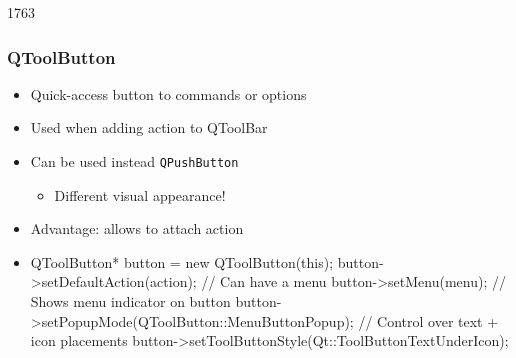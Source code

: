 \begin{slide}[fragile]{1763}\frametitle{QToolButton}
  \begin{itemize}
  \item Quick-access button to commands or options
  \item Used when adding action to QToolBar
  \item Can be used instead \texttt{QPushButton}
    \begin{itemize}
    \item Different visual appearance!
    \end{itemize}
 \item Advantage: allows to attach action
  \item[] \begin{cpp}
QToolButton* button = new QToolButton(this);
button->setDefaultAction(action);
// Can have a menu
button->setMenu(menu);      
// Shows menu indicator on  button
button->setPopupMode(QToolButton::MenuButtonPopup);
// Control over text + icon placements
button->setToolButtonStyle(Qt::ToolButtonTextUnderIcon);
    \end{cpp}

  \end{itemize}

\end{slide}


